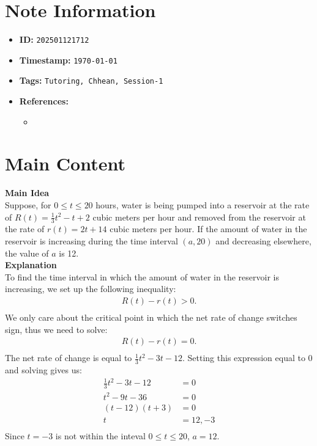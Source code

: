 \clearpage
{}
\label{202501121712}
\renewcommand{\notetitle}{Question 5}

\section*{Note Information}
\begin{itemize}
  \item \textbf{ID:} \texttt{202501121712}
  \item \textbf{Timestamp:} \texttt{\today \ \currenttime}
  \item \textbf{Tags:} \texttt{Tutoring, Chhean, Session-1}
  \item \textbf{References:}
    \begin{itemize}
      \item \href{}{}
    \end{itemize}
\end{itemize}


\section*{Main Content}
\textbf{Main Idea}\\
Suppose, for $0 \leq t \leq 20$ hours, water is being pumped into a reservoir at the rate of $R(t) = \frac{1}{3}t^2 - t + 2$ cubic meters per hour and removed from the reservoir at the rate of $r(t) = 2t + 14$ cubic meters per hour.
If the amount of water in the reservoir is increasing during the time interval $(a,20)$ and decreasing elsewhere, the value of $a$ is 12.\\

\textbf{Explanation}\\
To find the time interval in which the amount of water in the reservoir is increasing, we set up the following inequality:
\begin{align*}
  R(t) - r(t) > 0.\\
\end{align*}
We only care about the critical point in which the net rate of change switches sign, thus we need to solve:
\begin{align*}
  R(t) - r(t) = 0.\\
\end{align*}
The net rate of change is equal to $\frac{1}{3}t^2 - 3t - 12$. Setting this expression equal to 0 and solving gives us:
\begin{align*}
  \frac{1}{3}t^2 - 3t - 12 &= 0\\
  t^2 - 9t - 36 &= 0\\
  (t - 12)(t + 3) &= 0\\
  t &= 12, -3\\
\end{align*}
Since $t = -3$ is not within the inteval $0 \leq t \leq 20$, $a = 12$.\\

